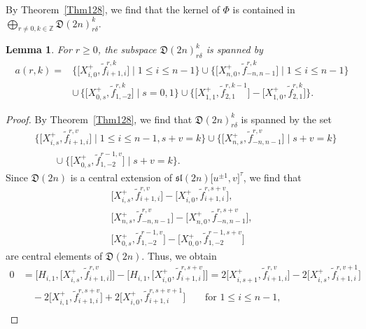 \documentclass[10pt,a4paper]{amsart}
\numberwithin{equation}{section}
\newtheorem{Lemma}[Theorem]{Lemma}
\theoremstyle{definition}
\begin{document}
By Theorem~\ref{Thm128}, we find that the kernel of $\Phi$ is contained in $\bigoplus_{r\neq0,k\in\mathbb{Z}}\mathfrak{D}(2n)_{r\delta}^k$.
\begin{Lemma}
For $r\geq0$, the subspace $\mathfrak{D}(2n)_{r\delta}^k$ is spanned by
\begin{align*}
a(r,k)={}&\bigl\{\bigl[X^+_{i,0},\widetilde{f}_{i+1,i}^{r,k}\bigr]\mid1\leq i\leq n-1\bigr\}\cup\bigl\{\bigl[X^+_{n,0},\widetilde{f}_{-n,n-1}^{r,k}\bigr]\mid1\leq i\leq n-1\bigr\}\\
&{\cup}\,\bigl\{\bigl[X^+_{0,s},\widetilde{f}_{1,-2}^{r,k}\bigr]\mid s=0,1\bigr\}\cup\bigl\{\bigl[X^+_{1,1},\widetilde{f}_{2,1}^{r,k-1}\bigr]-\bigl[X^+_{1,0},\widetilde{f}_{2,1}^{r,k}\bigr]\bigr\}.
\end{align*}
\end{Lemma}
\begin{proof}
By Theorem~\ref{Thm128}, we find that $\mathfrak{D}(2n)_{r\delta}^k$ is spanned by the set
\begin{align*}
&\bigl\{\bigl[X^+_{i,s},\widetilde{f}_{i+1,i}^{r,v}\bigr]\mid1\leq i\leq n-1,s+v=k\bigr\}\cup\bigl\{\bigl[X^+_{n,s},\widetilde{f}_{-n,n-1}^{r,v}\bigr]\mid s+v=k\bigr\}\\
&\qquad{}\cup\bigl\{\bigl[X^+_{0,s},\widetilde{f}_{1,-2}^{r-1,v}\bigr]\mid s+v=k\bigr\}.
\end{align*}
Since $\mathfrak{D}(2n)$ is a central extension of $\mathfrak{sl}(2n)\bigl[u^{\pm1},v\bigr]^\tau$, we find that
\begin{gather*}
\bigl[X^+_{i,s},\widetilde{f}_{i+1,i}^{r,v}\bigr]-\bigl[X^+_{i,0},\widetilde{f}_{i+1,i}^{r,s+v}\bigr],\\
\bigl[X^+_{n,s},\widetilde{f}_{-n,n-1}^{r,v}\bigr]-\bigl[X^+_{n,0},\widetilde{f}_{-n,n-1}^{r,s+v}\bigr],\\
\bigl[X^+_{0,s},\widetilde{f}_{1,-2}^{r-1,v}\bigr]-\bigl[X^+_{0,0},\widetilde{f}_{1,-2}^{r-1,s+v}\bigr]
\end{gather*}
are central elements of $\mathfrak{D}(2n)$. Thus, we obtain
\begin{align}
0&=\bigl[H_{i,1},\bigl[X^+_{i,s},\widetilde{f}_{i+1,i}^{r,v}\bigr]\bigr]-\bigl[H_{i,1},\bigl[X^+_{i,0}, \widetilde{f}_{i+1,i}^{r,s+v}\bigr]\bigr]=2\bigl[X^+_{i,s+1},\widetilde{f}_{i+1,i}^{r,v}\bigr] -2\bigl[X^+_{i,s},\widetilde{f}_{i+1,i}^{r,v+1}\bigr]\nonumber\\
&\quad-2\bigl[X^+_{i,1},\widetilde{f}_{i+1,i}^{r,s+v}\bigr]+2\bigl[X^+_{i,0},\widetilde{f}_{i+1,i}^{r,s+v+1}\bigr]\qquad \text{for }1\leq i\leq n-1,\label{eq92}\\

\end{align}
\end{proof}
\end{document}
